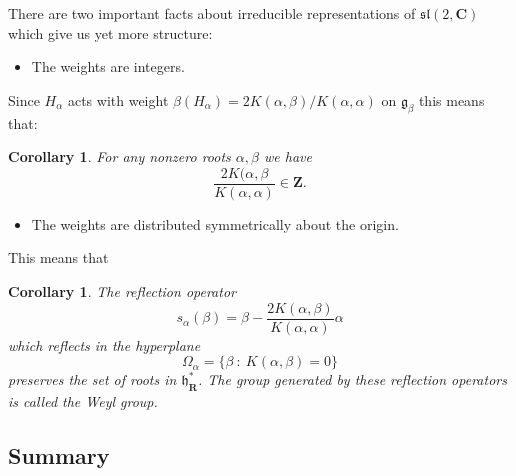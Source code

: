 \documentclass[12pt]{article}
\newcommand{\CC}{\mathbf{C}}
\newcommand{\RR}{\mathbf{R}}
\newcommand{\ZZ}{\mathbf{Z}}
\newtheorem{cor}[thm]{Corollary}
\theoremstyle{definition}
\theoremstyle{check}
\theoremstyle{remark}
\theoremstyle{TheoremNum}
\begin{document}
There are two important facts about irreducible representations of $\mathfrak{sl}(2,\CC)$ which give us yet more structure:
\begin{itemize}
\item The weights are integers.
\end{itemize}
Since $H_{\alpha}$ acts with weight $\beta(H_{\alpha})=2K(\alpha,\beta)/K(\alpha,\alpha)$ on $\mathfrak{g}_{\beta}$ this means that:
\begin{cor}
For any nonzero roots $\alpha,\beta$ we have
\[\frac{2K(\alpha,\beta}{K(\alpha,\alpha)}\in\ZZ.\]
\end{cor}
\begin{itemize}
\item The weights are distributed symmetrically about the origin.
\end{itemize}
This means that
\begin{cor}
The reflection operator
\[s_{\alpha}(\beta)=\beta-\frac{2K(\alpha,\beta)}{K(\alpha,\alpha)}\alpha\]
which reflects in the hyperplane
\[\Omega_{\alpha}=\{\beta\ :\ K(\alpha,\beta)=0\}\]
preserves the set of roots in $\mathfrak{h}_{\RR}^*$. The group generated by these reflection operators is called the {\em Weyl group}.
\end{cor}

\subsection{Summary}
\end{document}
